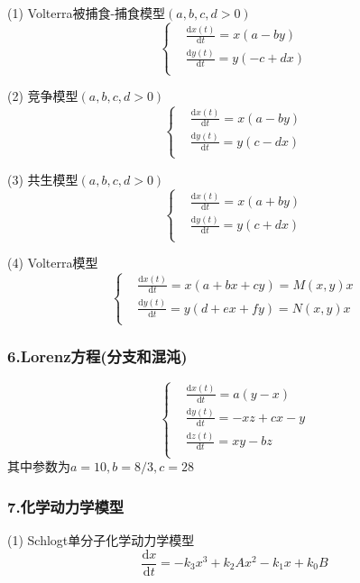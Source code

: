 (1) Volterra被捕食-捕食模型$(a,b,c,d>0)$
$$
\left\{ 
\begin{aligned}
{}&\frac{\mathrm{d}x(t)}{\mathrm{d}t} = x(a-by)\\
{}&\frac{\mathrm{d}y(t)}{\mathrm{d}t} = y(-c+dx)\\
\end{aligned}
\right. 
$$

(2) 竞争模型$(a,b,c,d>0)$
$$
\left\{ 
\begin{aligned}
{}&\frac{\mathrm{d}x(t)}{\mathrm{d}t} = x(a-by)\\
{}&\frac{\mathrm{d}y(t)}{\mathrm{d}t} = y(c-dx)\\
\end{aligned}
\right. 
$$

(3) 共生模型$(a,b,c,d>0)$
$$
\left\{ 
\begin{aligned}
{}&\frac{\mathrm{d}x(t)}{\mathrm{d}t} = x(a+by)\\
{}&\frac{\mathrm{d}y(t)}{\mathrm{d}t} = y(c+dx)\\
\end{aligned}
\right. 
$$

(4) Volterra模型
$$
\left\{ 
\begin{aligned}
{}&\frac{\mathrm{d}x(t)}{\mathrm{d}t} = x(a+bx+cy) = M(x,y)x\\
{}&\frac{\mathrm{d}y(t)}{\mathrm{d}t} = y(d+ex+fy) = N(x,y)x\\
\end{aligned}
\right. 
$$

\subsubsection{6.Lorenz方程(分支和混沌)}
$$
\left\{ 
\begin{aligned}
{}&\frac{\mathrm{d}x(t)}{\mathrm{d}t} = a(y-x)\\
{}&\frac{\mathrm{d}y(t)}{\mathrm{d}t} = -xz+cx-y \\
{}&\frac{\mathrm{d}z(t)}{\mathrm{d}t} = xy-bz \\
\end{aligned}
\right. 
$$
其中参数为$a=10,b=8/3,c=28$

\subsubsection{7.化学动力学模型}

(1) Schlogt单分子化学动力学模型
$$
\frac{\mathrm{d}x}{\mathrm{d}t} = -k_3x^3+k_2Ax^2-k_1x+k_0B
$$

